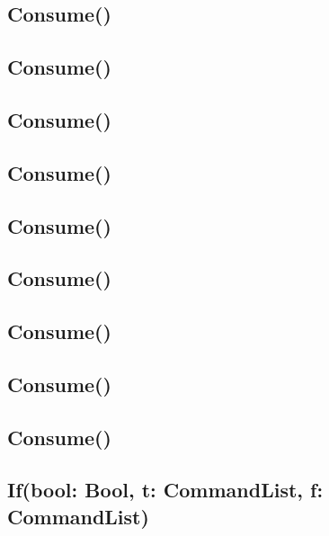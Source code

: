 \documentclass[uplatex,a4j]{jsreport}
\begin{document}
\subsection*{Consume()}

\subsection*{Consume()}

\subsection*{Consume()}

\subsection*{Consume()}

\subsection*{Consume()}

\subsection*{Consume()}

\subsection*{Consume()}

\subsection*{Consume()}

\subsection*{Consume()}

\subsection*{If(bool: Bool, t: CommandList, f: CommandList)}
\begin{prooftree}
\end{prooftree}
\begin{prooftree}
\end{prooftree}
\end{document}
